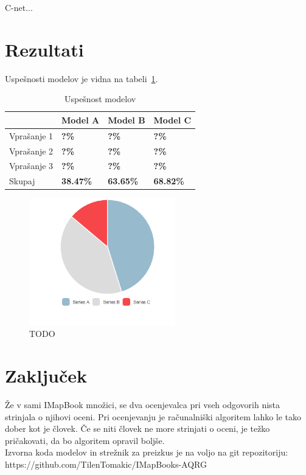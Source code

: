 \documentclass[journal]{IEEEtran}
\begin{document}
C-net...

\section{Rezultati}
Uspešnosti modelov je vidna na tabeli~\ref{t:mod}.

\begin{table}[]
	\begin{tabular}{l|l|l|l|}
		\cline{2-4}
		                            & Model A          & Model B          & Model C          \\ \hline
		\multicolumn{1}{|l|}{Vprašanje 1} & \textbf{?\%} & \textbf{?\%} & \textbf{?\%} \\ \hline
		\multicolumn{1}{|l|}{Vprašanje 2} & \textbf{?\%} & \textbf{?\%} & \textbf{?\%} \\ \hline
		\multicolumn{1}{|l|}{Vprašanje 3} & \textbf{?\%} & \textbf{?\%} & \textbf{?\%} \\ \hline
		\multicolumn{1}{|l|}{Skupaj} & \textbf{38.47\%} & \textbf{63.65\%} & \textbf{68.82\%} \\ \hline
	\end{tabular}
	\caption{Uspešnost modelov}
	\label{t:mod}
\end{table}

\begin{figure}[!t]
	\centering
	\includegraphics[width=2.5in]{chart}
	\caption{TODO}
	\label{sl:ma}
\end{figure}


\section{Zaključek}
Že v sami IMapBook množici, se dva ocenjevalca pri vseh odgovorih nista strinjala o njihovi oceni. Pri ocenjevanju je računalniški algoritem lahko le tako dober kot je človek. Če se niti človek ne more strinjati o oceni, je težko pričakovati, da bo algoritem opravil boljše.\\

Izvorna koda modelov in strežnik za preizkus je na voljo na git repozitoriju: https://github.com/TilenTomakic/IMapBooks-AQRG

\ifCLASSOPTIONcaptionsoff
  \newpage
\fi



\end{document}
